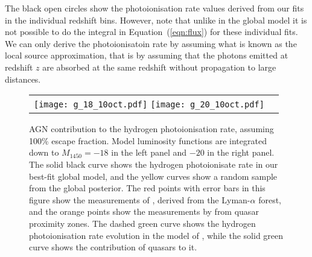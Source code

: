 \documentclass[a4paper,fleqn,usenatbib]{mnras}
\begin{document}
The black open circles show the photoionisation rate values derived
from our fits in the individual redshift bins.  However, note that
unlike in the global model it is not possible to do the integral in
Equation~(\ref{eqn:flux}) for these individual fits.  We can only
derive the photoionisatoin rate by assuming what is known as the local
source approximation, that is by assuming that the photons emitted at
redshift $z$ are absorbed at the same redshift without propagation to
large distances.

\begin{figure*}
  \begin{center}
    \begin{tabular}{cc}
    \texttt{[image: g\_18\_10oct.pdf]}
    \texttt{[image: g\_20\_10oct.pdf]}
    \end{tabular}
  \end{center}
  \caption{AGN contribution to the hydrogen photoionisation rate,
    assuming 100\% escape fraction.  Model luminosity functions are
    integrated down to $M_{1450}=-18$ in the left panel and $-20$ in
    the right panel.  The solid black curve shows the hydrogen
    photoionisate rate in our best-fit global model, and the yellow
    curves show a random sample from the global posterior.  The red
    points with error bars in this figure show the measurements of
    \citet{2013MNRAS.436.1023B}, derived from the Lyman-$\alpha$
    forest, and the orange points show the measurements by
    \citet{2011MNRAS.412.2543C} from quasar proximity zones.  The
    dashed green curve shows the hydrogen photoionisation rate
    evolution in the model of \citet{2012ApJ...746..125H}, while the
    solid green curve shows the contribution of quasars to it. }
  \label{fig:gammapi}
\end{figure*}
\end{document}
